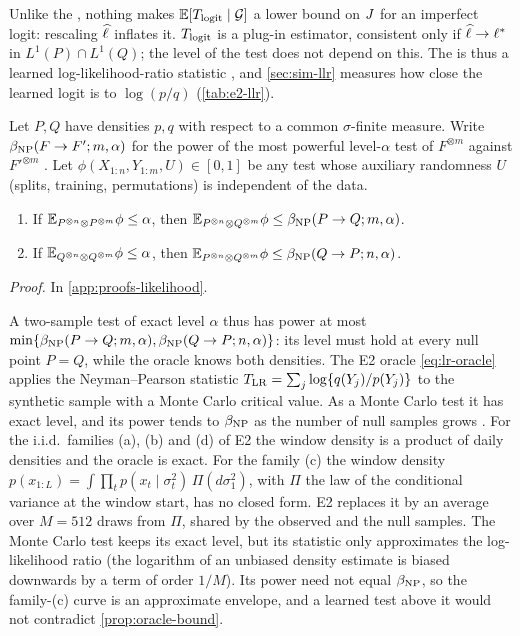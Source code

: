 Unlike the \WC{}, nothing makes $\mathbb{E}[T_{\mathrm{logit}}\mid\mathcal{G}]$ a lower bound on $J$ for an imperfect
logit: rescaling $\widehat{\ell}$ inflates it. $T_{\mathrm{logit}}$ is a plug-in estimator, consistent only if
$\widehat{\ell}\to\ell^{*}$ in $L^1(P)\cap L^1(Q)$; the level of the test does not depend on this. The
\LRC{} is thus a learned log-likelihood-ratio statistic \citep{cheng2022classification}, and
\cref{sec:sim-llr} measures how close the learned logit is to $\log(p/q)$ (\cref{tab:e2-llr}).

\begin{proposition}\label{prop:oracle-bound}
Let $P,Q$ have densities $p,q$ with respect to a common $\sigma$-finite measure. Write
$\beta_{\mathrm{NP}}(F\to F';m,\alpha)$ for the power of the most powerful level-$\alpha$ test of
$F^{\otimes m}$ against $F'^{\otimes m}$ \citep{lehmann2022testing}. Let
$\phi(X_{1:n},Y_{1:m},U)\in[0,1]$ be any test whose auxiliary randomness $U$ (splits, training,
permutations) is independent of the data.
\begin{enumerate}
  \item[(a)] If $\mathbb{E}_{P^{\otimes n}\otimes P^{\otimes m}}\phi\le\alpha$, then
  $\mathbb{E}_{P^{\otimes n}\otimes Q^{\otimes m}}\phi\le\beta_{\mathrm{NP}}(P\to Q;m,\alpha)$.
  \item[(b)] If $\mathbb{E}_{Q^{\otimes n}\otimes Q^{\otimes m}}\phi\le\alpha$, then
  $\mathbb{E}_{P^{\otimes n}\otimes Q^{\otimes m}}\phi\le\beta_{\mathrm{NP}}(Q\to P;n,\alpha)$.
\end{enumerate}
\end{proposition}
\noindent\textit{Proof.} In \cref{app:proofs-likelihood}.

A two-sample test of exact level $\alpha$ thus has power at most
$\min\{\beta_{\mathrm{NP}}(P\to Q;m,\alpha),\beta_{\mathrm{NP}}(Q\to P;n,\alpha)\}$: its level must hold at every null point
$P=Q$, while the oracle knows both densities. The E2 oracle \eqref{eq:lr-oracle} applies the
Neyman--Pearson statistic $T_{\mathrm{LR}}=\sum_j\log\{q(Y_j)/p(Y_j)\}$ to the synthetic sample with a Monte
Carlo critical value. As a Monte Carlo test it has exact level, and its power tends to $\beta_{\mathrm{NP}}$ as
the number of null samples grows \citep{dufour_2006_monte}. For the i.i.d.\ families (a), (b) and
(d) of E2 the window density is a product of daily densities and the oracle is exact. For the
\GARCHt{} family (c) the window density
$p(x_{1:L})=\int\prod_tp(x_t\mid\sigma_t^2)\,\Pi(d\sigma_1^2)$, with $\Pi$ the law of the
conditional variance at the window start, has no closed form. E2 replaces it by an average over
$M=512$ draws from $\Pi$, shared by the observed and the null samples. The Monte Carlo test keeps
its exact level, but its statistic only approximates the log-likelihood ratio (the logarithm of an
unbiased density estimate is biased downwards by a term of order $1/M$). Its power need not equal
$\beta_{\mathrm{NP}}$, so the family-(c) curve is an approximate envelope, and a learned test above it would not
contradict \cref{prop:oracle-bound}.

